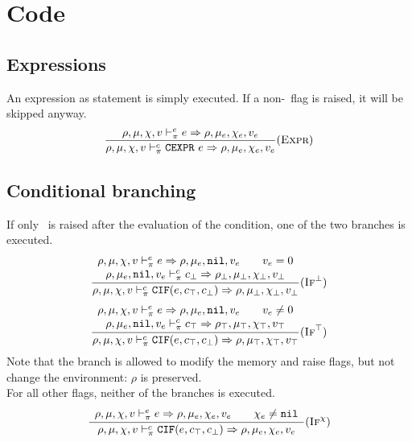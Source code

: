 \section{Code}
\subsection{Expressions}
An expression as statement is simply executed. If a non-\nil\ flag is raised, it will be skipped anyway.\\
\[\dfrac{
    \rho,\mu,\chi,v \vdash_\pi^e e \Rightarrow \rho,\mu_e,\chi_e,v_e
}{\rho,\mu,\chi,v \vdash_\pi^c \texttt{CEXPR}\ e \Rightarrow \rho,\mu_e,\chi_e,v_e}(\textsc{Expr})\]

\subsection{Conditional branching}
If only \nil\ is raised after the evaluation of the condition, one of the two branches is executed.
\[\dfrac{\begin{array}{c}
    \rho,\mu,\chi,v \vdash_\pi^e e \Rightarrow \rho,\mu_e,\texttt{nil},v_e \qquad v_e = 0 \\
    \rho,\mu_e,\texttt{nil},v_e \vdash_\pi^c c_\bot \Rightarrow \rho_\bot,\mu_\bot,\chi_\bot,v_\bot \\
\end{array}}{\rho,\mu,\chi,v \vdash_\pi^c \texttt{CIF}(e, c_\top, c_\bot) \Rightarrow \rho,\mu_\bot,\chi_\bot,v_\bot} (\textsc{If}^\bot)\]
\[\dfrac{\begin{array}{c}
    \rho,\mu,\chi,v \vdash_\pi^e e \Rightarrow \rho,\mu_e,\texttt{nil},v_e \qquad v_e \ne 0 \\
    \rho,\mu_e,\texttt{nil},v_e \vdash_\pi^c c_\top \Rightarrow \rho_\top,\mu_\top,\chi_\top,v_\top \\
\end{array}}{\rho,\mu,\chi,v \vdash_\pi^c \texttt{CIF}(e, c_\top, c_\bot) \Rightarrow \rho,\mu_\top,\chi_\top,v_\top} (\textsc{If}^\top)\]
Note that the branch is allowed to modify the memory and raise flags, but not change the environment: \(\rho\) is preserved.\\

For all other flags, neither of the branches is executed.
\[\dfrac{\begin{array}{c}
\rho,\mu,\chi,v \vdash_\pi^e e \Rightarrow \rho,\mu_e,\chi_e,v_e \qquad \chi_e\ne\texttt{nil} \\
\end{array}}{\rho,\mu,\chi,v \vdash_\pi^c \texttt{CIF}(e, c_\top, c_\bot) \Rightarrow \rho,\mu_e,\chi_e,v_e} (\textsc{If}^\chi)\]

